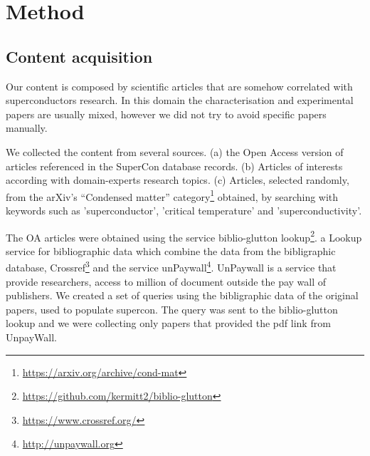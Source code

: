 \documentclass[a4paper,10pt]{article}
\begin{document}

\label{sec:method}
\section{Method}
\subsection{Content acquisition}
Our content is composed by scientific articles that are somehow correlated with superconductors research. In this domain the characterisation and experimental papers are usually mixed, however we did not try to avoid specific papers manually. 

We collected the content from several sources. (a) the Open Access version of articles referenced in the SuperCon database records. (b) Articles of interests according with domain-experts research topics. (c) Articles, selected randomly, from the arXiv's “Condensed matter” category\footnote{\url{https://arxiv.org/archive/cond-mat}} obtained, by searching with keywords such as 'superconductor', 'critical temperature' and 'superconductivity'.

The OA articles were obtained using the service biblio-glutton lookup\footnote{\url{https://github.com/kermitt2/biblio-glutton}}. a Lookup service for bibliographic data which combine the data from the bibligraphic database, Crossref\footnote{\url{https://www.crossref.org/}} and the service unPaywall\footnote{\url{http://unpaywall.org}}. UnPaywall is a service that provide researchers, access to million of document outside the pay wall of publishers. 
We created a set of queries using the bibligraphic data of the original papers, used to populate supercon. The query was sent to the biblio-glutton lookup and we were collecting only papers that provided the pdf link from UnpayWall.
\end{document}
